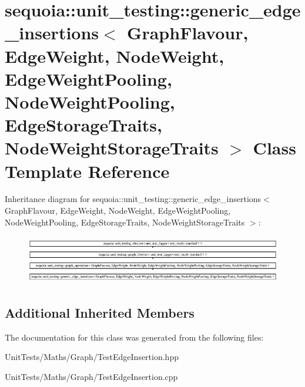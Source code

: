 \hypertarget{classsequoia_1_1unit__testing_1_1generic__edge__insertions}{}\section{sequoia\+::unit\+\_\+testing\+::generic\+\_\+edge\+\_\+insertions$<$ Graph\+Flavour, Edge\+Weight, Node\+Weight, Edge\+Weight\+Pooling, Node\+Weight\+Pooling, Edge\+Storage\+Traits, Node\+Weight\+Storage\+Traits $>$ Class Template Reference}
\label{classsequoia_1_1unit__testing_1_1generic__edge__insertions}
Inheritance diagram for sequoia\+::unit\+\_\+testing\+::generic\+\_\+edge\+\_\+insertions$<$ Graph\+Flavour, Edge\+Weight, Node\+Weight, Edge\+Weight\+Pooling, Node\+Weight\+Pooling, Edge\+Storage\+Traits, Node\+Weight\+Storage\+Traits $>$\+:\begin{figure}[H]
\begin{center}
\leavevmode
\includegraphics[height=2.164251cm]{classsequoia_1_1unit__testing_1_1generic__edge__insertions}
\end{center}
\end{figure}
\subsection*{Additional Inherited Members}


The documentation for this class was generated from the following files\+:\begin{DoxyCompactItemize}
\item 
Unit\+Tests/\+Maths/\+Graph/Test\+Edge\+Insertion.\+hpp\item 
Unit\+Tests/\+Maths/\+Graph/Test\+Edge\+Insertion.\+cpp\end{DoxyCompactItemize}
